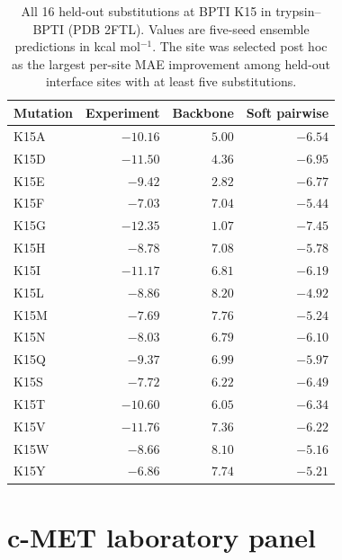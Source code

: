\documentclass[preprint,12pt]{elsarticle}
\begin{document}
\begin{table}[H]
\centering
\caption{All 16 held-out substitutions at BPTI K15 in trypsin--BPTI (PDB 2FTL). Values are five-seed ensemble predictions in kcal mol$^{-1}$. The site was selected post hoc as the largest per-site MAE improvement among held-out interface sites with at least five substitutions.}
\label{tab:case_2ftl}
\begin{tabular}{lrrr}
\toprule
Mutation & Experiment & Backbone & Soft pairwise \\
\midrule
K15A & $-10.16$ & $5.00$ & $-6.54$ \\
K15D & $-11.50$ & $4.36$ & $-6.95$ \\
K15E & $-9.42$ & $2.82$ & $-6.77$ \\
K15F & $-7.03$ & $7.04$ & $-5.44$ \\
K15G & $-12.35$ & $1.07$ & $-7.45$ \\
K15H & $-8.78$ & $7.08$ & $-5.78$ \\
K15I & $-11.17$ & $6.81$ & $-6.19$ \\
K15L & $-8.86$ & $8.20$ & $-4.92$ \\
K15M & $-7.69$ & $7.76$ & $-5.24$ \\
K15N & $-8.03$ & $6.79$ & $-6.10$ \\
K15Q & $-9.37$ & $6.99$ & $-5.97$ \\
K15S & $-7.72$ & $6.22$ & $-6.49$ \\
K15T & $-10.60$ & $6.05$ & $-6.34$ \\
K15V & $-11.76$ & $7.36$ & $-6.22$ \\
K15W & $-8.66$ & $8.10$ & $-5.16$ \\
K15Y & $-6.86$ & $7.74$ & $-5.21$ \\
\bottomrule
\end{tabular}
\end{table}

\section{c-MET laboratory panel}
\end{document}
